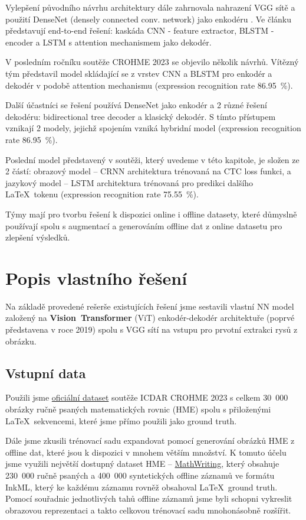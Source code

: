 Vylepšení původního návrhu architektury dále zahrnovala nahrazení VGG sítě a použití DenseNet (densely connected conv. network) jako enkodéru \cite{ZHANG_2}. Ve článku \cite{LeAnhDuc} představují end-to-end řešení: kaskáda CNN - feature extractor, BLSTM - encoder a LSTM s attention mechanismem jako dekodér.

V posledním ročníku soutěže CROHME 2023 se objevilo několik návrhů. Vítězný tým představil model skládající se z vrstev CNN a BLSTM pro enkodér a dekodér v podobě attention mechanismu (expression recognition rate 86.95~\%).

Další účastníci se řešení používá DenseNet jako enkodér a 2 různé řešení dekodéru: bidirectional tree decoder a klasický dekodér. S tímto přístupem vznikají 2 modely, jejichž spojením vzniká hybridní model (expression recognition rate 86.95~\%). 

Poslední model představený v soutěži, který uvedeme v této kapitole, je složen ze 2 částí: obrazový model -- CRNN architektura trénovaná na CTC loss funkci, a jazykový model -- LSTM architektura trénovaná pro predikci dalšího \LaTeX~tokenu (expression recognition rate 75.55~\%).

Týmy mají pro tvorbu řešení k dispozici online i offline datasety, které důmyslně používají spolu s augmentací a generováním offline dat z online datasetu pro zlepšení výsledků.


\cite{CROHME_2023}



\section{Popis vlastního řešení}

Na základě provedené rešerše existujících řešení jsme sestavili vlastní NN model založený na \textbf{Vision~Transformer} (ViT) enkodér-dekodér architektuře (poprvé představena v roce 2019) spolu s VGG sítí na vstupu pro prvotní extrakci rysů z obrázku. 


\subsection{Vstupní data}
Použili jsme \href{https://ai.100tal.com/icdar}{oficiální dataset} soutěže ICDAR CROHME 2023 s celkem 30~000 obrázky ručně psaných matematických rovnic (HME) spolu s přiloženými \LaTeX~sekvencemi, které jsme přímo použili jako ground truth.

Dále jsme zkusili trénovací sadu expandovat pomocí generování obrázků HME z offline dat, které jsou k dispozici v mnohem větším množství. K tomuto účelu jsme využili největší dostupný dataset HME -- \href{https://arxiv.org/html/2404.10690v1}{MathWriting}, který obsahuje 230~000 ručně psaných a 400~000 syntetických offline záznamů ve formátu InkML, který ke každému záznamu rovněž obsahoval \LaTeX~ground truth. Pomocí souřadnic jednotlivých tahů offline záznamů jsme byli schopni vykreslit obrazovou reprezentaci a takto celkovou trénovací sadu mnohonásobně rozšířit.

